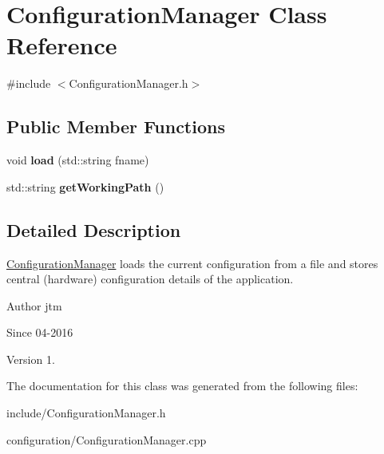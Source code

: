 \hypertarget{classConfigurationManager}{\section{Configuration\-Manager Class Reference}
\label{classConfigurationManager}
}


{\ttfamily \#include $<$Configuration\-Manager.\-h$>$}

\subsection*{Public Member Functions}
\begin{DoxyCompactItemize}
\item 
\hypertarget{classConfigurationManager_a066a7ae7e01b7ba6b62782fd3eeffaab}{void {\bfseries load} (std\-::string fname)}\label{classConfigurationManager_a066a7ae7e01b7ba6b62782fd3eeffaab}

\item 
\hypertarget{classConfigurationManager_ab4fac4121f154fb83b67a727b650c436}{std\-::string {\bfseries get\-Working\-Path} ()}\label{classConfigurationManager_ab4fac4121f154fb83b67a727b650c436}

\end{DoxyCompactItemize}


\subsection{Detailed Description}
\hyperlink{classConfigurationManager}{Configuration\-Manager} loads the current configuration from a file and stores central (hardware) configuration details of the application.

\begin{DoxyAuthor}{Author}
jtm 
\end{DoxyAuthor}
\begin{DoxySince}{Since}
04-\/2016 
\end{DoxySince}
\begin{DoxyVersion}{Version}
1. 
\end{DoxyVersion}


The documentation for this class was generated from the following files\-:\begin{DoxyCompactItemize}
\item 
include/Configuration\-Manager.\-h\item 
configuration/Configuration\-Manager.\-cpp\end{DoxyCompactItemize}
